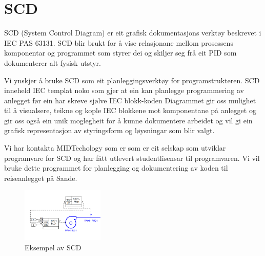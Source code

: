 \section{SCD}
\thispagestyle{fancy}


 \gls{SCD} (System Control Diagram) er eit grafisk dokumentasjons verktøy beskrevet i IEC PAS 63131.\newline
 \gls{SCD} blir brukt for å vise relasjonane mellom prosessens komponentar og programmet som styrer dei og skiljer seg frå eit \gls{PID}
 som dokumenterer alt fysisk utstyr.

 Vi ynskjer å bruke SCD som eit planleggingsverktøy for programstrukteren. SCD inneheld IEC templat noko som gjer at ein kan
 planlegge programmering av anlegget før ein har skreve sjølve IEC blokk-koden
 Diagrammet gir oss mulighet til å visualsere, teikne og kople IEC blokkene mot komponentane på anlegget og 
 gir oss også ein unik moglegheit for å kunne dokumentere arbeidet og vil gi ein grafisk representasjon
 av styringsform og løysningar som blir valgt.

 Vi har kontakta MIDTechology\citep{MIDT} som er som er eit selskap som utviklar programvare for SCD og har fått utlevert studentlisensar
 til programvaren. Vi vil bruke dette programmet for planlegging og dokumentering av koden til reiseanlegget på Sande.

 \begin{figure}[htbp]
    \centering
    \includegraphics[width=0.35\textwidth]{Bilder/Visio_eksempel.png}
    \caption{Eksempel av SCD}\label{fig:SCD eksempel}    
\end{figure}

\newpage